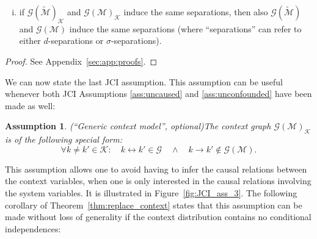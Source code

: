 \documentclass[twoside,11pt]{article}
\DeclareMathOperator*{\SEP}{\perp}
\newcommand\sep[4]{{#1} \SEP_{#4} {#2} \given {#3}}
\newcommand{\Prb}{\mathbb{P}}
\newcommand\B[1]{\bm{#1}}
\newcommand\C[1]{\mathcal{#1}}
\newcommand\given{\,|\,}
\newtheorem{assumption}{Assumption}
\newcommand{\oto}{\leftrightarrow}
\newcommand{\intervene}{\mathrm{do}}
\begin{document}
{\begin{enumerate}[(i)]
    \item if $\C{G}(\tilde{\C{M}})_{\C{K}}$ and $\C{G}(\C{M})_{\C{K}}$ induce the same separations, then also $\C{G}(\tilde{\C{M}})$ and $\C{G}(\C{M})$ induce the same separations (where ``separations'' can refer to either $d$-separations or $\sigma$-separations).
  \end{enumerate}}
\begin{theorem}\label{thm:replace_context}
\cmdTheoremReplaceContext
\end{theorem}
\begin{proof}
  See Appendix~\ref{sec:app:proofs}.
\end{proof}
We can now state the last JCI assumption.
This assumption can be useful whenever both JCI Assumptions \ref{ass:uncaused} and 
\ref{ass:unconfounded} have been made as well:
\begin{assumption}(``Generic context model'', optional)\label{ass:dependences}
The context graph $\C{G}(\C{M})_{\C{K}}$ is of the following special form: 
$$\forall k \ne k' \in \C{K}: \quad k \oto k' \in \C{G} \quad \land \quad k \to k' \notin \C{G}(\C{M}).$$
\end{assumption}
This assumption allows one to avoid having to infer the causal relations between the context variables,
when one is only interested in the causal relations involving the system variables. It is illustrated in Figure~\ref{fig:JCI_ass_3}. 
The following
corollary of Theorem~\ref{thm:replace_context} states that this assumption can be made without loss of generality if the context distribution contains no conditional independences:
\end{document}
